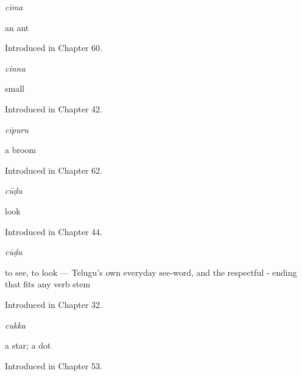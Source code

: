 \noindent\begin{minipage}[t]{\linewidth}
\raggedright
\textbf{}\enspace\emph{cīma}\par
\small an ant\par
\footnotesize Introduced in Chapter 60.
\end{minipage}\par\medskip

\noindent\begin{minipage}[t]{\linewidth}
\raggedright
\textbf{}\enspace\emph{cinna}\par
\small small\par
\footnotesize Introduced in Chapter 42.
\end{minipage}\par\medskip

\noindent\begin{minipage}[t]{\linewidth}
\raggedright
\textbf{}\enspace\emph{cīpuru}\par
\small a broom\par
\footnotesize Introduced in Chapter 62.
\end{minipage}\par\medskip

\noindent\begin{minipage}[t]{\linewidth}
\raggedright
\textbf{}\enspace\emph{cūḍu}\par
\small look\par
\footnotesize Introduced in Chapter 44.
\end{minipage}\par\medskip

\noindent\begin{minipage}[t]{\linewidth}
\raggedright
\textbf{}\enspace\emph{cūḍu}\par
\small to see, to look — Telugu's own everyday see-word, and the respectful - ending that fits any verb stem\par
\footnotesize Introduced in Chapter 32.
\end{minipage}\par\medskip

\noindent\begin{minipage}[t]{\linewidth}
\raggedright
\textbf{}\enspace\emph{cukka}\par
\small a star; a dot\par
\footnotesize Introduced in Chapter 53.
\end{minipage}\par\medskip

